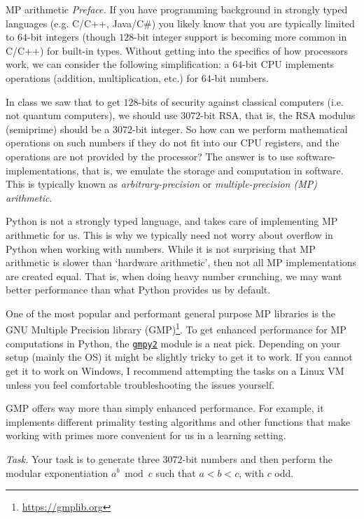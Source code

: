 \documentclass{practice}
\begin{document}
\begin{task}{MP arithmetic}
  \textit{Preface.}
  If you have programming background in strongly typed languages (e.g. C/C++, Java/C\#) you likely know that you are typically limited to $64$-bit integers (though $128$-bit integer support is becoming more common in C/C++) for built-in types.
  Without getting into the specifics of how processors work, we can consider the following simplification: a $64$-bit CPU implements operations (addition, multiplication, etc.) for $64$-bit numbers.

  In class we saw that to get $128$-bits of security against classical computers (i.e. not quantum computers), we should use $3072$-bit RSA, that is, the RSA modulus (semiprime) should be a $3072$-bit integer.
  So how can we perform mathematical operations on such numbers if they do not fit into our CPU registers, and the operations are not provided by the processor?
  The answer is to use software-implementations, that is, we emulate the storage and computation in software.
  This is typically known as \emph{arbitrary-precision} or \emph{multiple-precision (MP) arithmetic}.

  Python is not a strongly typed language, and takes care of implementing MP arithmetic for us.
  This is why we typically need not worry about overflow in Python when working with numbers.
  While it is not surprising that MP arithmetic is slower than `hardware arithmetic', then not all MP implementations are created equal.
  That is, when doing heavy number crunching, we may want better performance than what Python provides us by default.

  One of the most popular and performant general purpose MP libraries is the GNU Multiple Precision library (GMP)\footnote{\url{https://gmplib.org}}.
  To get enhanced performance for MP computations in Python, the \href{https://pypi.org/project/gmpy2/}{\texttt{gmpy2}} module is a neat pick.
  Depending on your setup (mainly the OS) it might be slightly tricky to get it to work.
  If you cannot get it to work on Windows, I recommend attempting the tasks on a Linux VM unless you feel comfortable troubleshooting the issues yourself.

  GMP offers way more than simply enhanced performance.
  For example, it implements different primality testing algorithms and other functions that make working with primes more convenient for us in a learning setting.

  \textit{Task.}
  Your task is to generate three $3072$-bit numbers and then perform the modular exponentiation $a^b \bmod c$ such that $a < b < c$, with $c$ odd.


\end{task}
\end{document}

